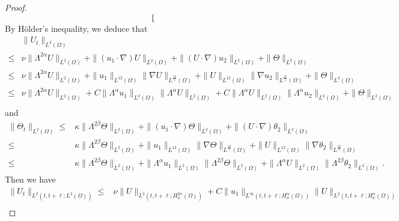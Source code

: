 \documentclass[oneside,preprint,12pt,numbers,sort&compress]{elsarticle}
\begin{document}
\begin{proof}
\begin{equation*}
\begin{cases}
\end{cases}
\end{equation*}
By H\"{o}lder’s inequality, we deduce that
\begin{equation}\label{eq030809}
\begin{aligned}
&\| U_{t} \|_{L^{2}(\Omega)}\\
\leq
& \nu \| \Lambda^{2\alpha} U \|_{L^2(\Omega)}
+ \| (u_1 \cdot \nabla) U \|_{L^{2}(\Omega)}
+ \| (U \cdot \nabla) u_2 \|_{L^{2}(\Omega)}
+ \| \Theta \|_{L^{2}(\Omega)} 
\\ 
\leq
& \nu \| \Lambda^{2\alpha} U \|_{L^2(\Omega)}
+ \| u_1  \|_{L^{12}(\Omega)}
\| \nabla U \|_{L^{\frac{12}{5}}(\Omega)}
+ \| U \|_{L^{12}(\Omega)}
\| \nabla  u_2 \|_{L^{\frac{12}{5}}(\Omega)}
+ \| \Theta \|_{L^{2}(\Omega)} 
\\ 
\leq
& \nu \| \Lambda^{2\alpha} U \|_{L^2(\Omega)}
+ C\| \Lambda^{\alpha}u_1  \|_{L^{2}(\Omega)}
\| \Lambda^{\alpha} U \|_{L^{2}(\Omega)}
+ C\| \Lambda^{\alpha}U \|_{L^{2}(\Omega)}
\| \Lambda^{\alpha} u_2 \|_{L^{2}(\Omega)}
+ \| \Theta \|_{L^{2}(\Omega)} 
\\ 
\end{aligned}
\end{equation}
and
\begin{equation}\label{eq030810}
\begin{aligned}
\| \Theta_t \|_{L^2(\Omega)} 
\leq
& \kappa \| \Lambda^{2\beta} \Theta  \|_{L^2(\Omega)}
+ 
\| (u_1 \cdot \nabla) \Theta  \|_{L^{2}(\Omega)}
+ \| (U \cdot \nabla) \theta_2 \|_{L^{2}(\Omega)}\\
\leq
& \kappa \| \Lambda^{2\beta} \Theta  \|_{L^2(\Omega)}
+ 
\| u_1  \|_{L^{12}(\Omega)}
\| \nabla \Theta \|_{L^{\frac{12}{5}}(\Omega)}
+ \| U \|_{L^{12}(\Omega)}
\| \nabla  \theta_2 \|_{L^{\frac{12}{5}}(\Omega)}\\
\leq
& \kappa \| \Lambda^{2\beta} \Theta  \|_{L^2(\Omega)}
+ 
\| \Lambda^{\alpha}u_1  \|_{L^{2}(\Omega)}
\| \Lambda^{2\beta}\Theta \|_{L^{2}(\Omega)}
+ \| \Lambda^{\alpha}U \|_{L^{2}(\Omega)}
\|  \Lambda^{2\beta} \theta_2 \|_{L^{2}(\Omega)}.
\end{aligned}
\end{equation}
Then we have
\begin{equation}\label{eq030811}
\begin{aligned}
\| U_{t} \|_{L^{2}(t,t+\ell;L^{2}(\Omega))}
\leq
& \nu \| U \|_{L^{2}(t,t+\ell;H_\sigma^{2\alpha}(\Omega))}
+ C\| u_1 \|_{L^{\infty}(t,t+\ell;H_\sigma^{\alpha}(\Omega))}
\| U \|_{L^{2}(t,t+\ell;H_\sigma^{\alpha}(\Omega))} \\

\end{aligned}
\end{equation}
\end{proof}
\end{document}
